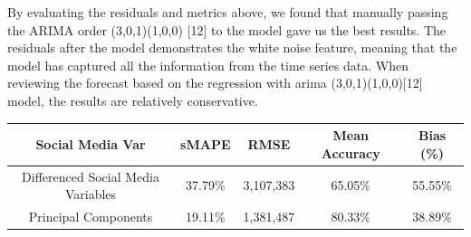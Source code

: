 \documentclass[12pt,oneside]{chicagocapstone}
\begin{document}
By evaluating the residuals and metrics above, we found that manually
passing the ARIMA order (3,0,1)(1,0,0) {[}12{]} to the model gave us the
best results. The residuals after the model demonstrates the white noise
feature, meaning that the model has captured all the information from
the time series data. When reviewing the forecast based on the
regression with arima (3,0,1)(1,0,0){[}12{]} model, the results are
relatively conservative.
\begin{longtable}[]{@{}ccccc@{}}
\toprule
\begin{minipage}[b]{0.27\columnwidth}\centering\strut
Social Media Var\strut
\end{minipage} & \begin{minipage}[b]{0.13\columnwidth}\centering\strut
sMAPE\strut
\end{minipage} & \begin{minipage}[b]{0.14\columnwidth}\centering\strut
RMSE\strut
\end{minipage} & \begin{minipage}[b]{0.16\columnwidth}\centering\strut
Mean Accuracy\strut
\end{minipage} & \begin{minipage}[b]{0.16\columnwidth}\centering\strut
Bias (\%)\strut
\end{minipage}\tabularnewline
\midrule
\endhead
\begin{minipage}[t]{0.27\columnwidth}\centering\strut
Differenced Social Media Variables\strut
\end{minipage} & \begin{minipage}[t]{0.13\columnwidth}\centering\strut
37.79\%\strut
\end{minipage} & \begin{minipage}[t]{0.14\columnwidth}\centering\strut
3,107,383\strut
\end{minipage} & \begin{minipage}[t]{0.16\columnwidth}\centering\strut
65.05\%\strut
\end{minipage} & \begin{minipage}[t]{0.16\columnwidth}\centering\strut
55.55\%\strut
\end{minipage}\tabularnewline
\begin{minipage}[t]{0.27\columnwidth}\centering\strut
Principal Components\strut
\end{minipage} & \begin{minipage}[t]{0.13\columnwidth}\centering\strut
19.11\%\strut
\end{minipage} & \begin{minipage}[t]{0.14\columnwidth}\centering\strut
1,381,487\strut
\end{minipage} & \begin{minipage}[t]{0.16\columnwidth}\centering\strut
80.33\%\strut
\end{minipage} & \begin{minipage}[t]{0.16\columnwidth}\centering\strut
38.89\%\strut
\end{minipage}\tabularnewline
\bottomrule
\end{longtable}
\end{document}
